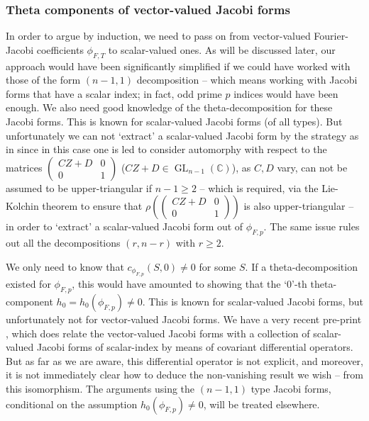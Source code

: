 \documentclass[11pt]{amsart}
\numberwithin{equation}{section}
\newcommand{\psmb}{\left( \begin{smallmatrix}}
\newcommand{\psme}{ \end{smallmatrix} \right)}
\newcommand*{\GL}[2]{\operatorname{GL}_{#1}(#2)}
\newcommand{\complex}{\mathbb{C}}
\begin{document}
\subsubsection{Theta components of vector-valued Jacobi forms}
In order to argue by induction, we need to pass on from vector-valued Fourier-Jacobi coefficients $\phi_{F,T}$ to scalar-valued ones. As will be discussed later, our approach would have been significantly simplified if we could have worked with those of the form $(n-1,1)$ decomposition -- which means working with Jacobi forms that have a scalar index; in fact, odd prime $p$ indices would have been enough. We also need good knowledge of the theta-decomposition for these Jacobi forms. This is known for scalar-valued Jacobi forms (of all types). But unfortunately we can not `extract' a scalar-valued Jacobi form by the strategy as in \cite{boche-das} since in this case one is led to consider automorphy with respect to the matrices $\psmb  CZ+D & 0 \\ 0 & 1\psme$ ($CZ+D \in \GL{n-1}{\complex}$), as $C,D$ vary, can not be assumed to be upper-triangular if $n-1 \ge 2$ -- which is required, via the Lie-Kolchin theorem to  ensure that $\rho (\psmb  CZ+D & 0 \\ 0 & 1\psme) $ is also upper-triangular -- in order to `extract' a scalar-valued Jacobi form out of $\phi_{F,p}$. The same issue rules out all the decompositions $(r,n-r)$ with $r \ge 2$.

We only need to know that $c_{\phi_{F,p}}(S,0) \neq 0$ for some $S$. If a theta-decomposition existed for $\phi_{F,p}$, this would have amounted to showing that the `$0$'-th theta-component $h_0=h_{0}(\phi_{F,p})\neq 0$.  This is known for scalar-valued Jacobi forms, but
unfortunately not for vector-valued Jacobi forms. We have a very recent pre-print  \cite{raum25}, which does relate the vector-valued Jacobi forms with a collection of scalar-valued Jacobi forms of scalar-index by means of covariant differential operators. But as far as we are aware, this differential operator is not explicit, and moreover, it is not immediately clear how to deduce the non-vanishing result we wish -- from this isomorphism. The arguments using the $(n-1,1)$ type Jacobi forms, conditional on the assumption $h_{0}(\phi_{F,p})\neq 0$, will be treated elsewhere. %
\end{document}
